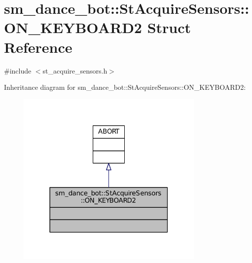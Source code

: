 \hypertarget{structsm__dance__bot_1_1StAcquireSensors_1_1ON__KEYBOARD2}{}\section{sm\+\_\+dance\+\_\+bot\+:\+:St\+Acquire\+Sensors\+:\+:O\+N\+\_\+\+K\+E\+Y\+B\+O\+A\+R\+D2 Struct Reference}
\label{structsm__dance__bot_1_1StAcquireSensors_1_1ON__KEYBOARD2}


{\ttfamily \#include $<$st\+\_\+acquire\+\_\+sensors.\+h$>$}



Inheritance diagram for sm\+\_\+dance\+\_\+bot\+:\+:St\+Acquire\+Sensors\+:\+:O\+N\+\_\+\+K\+E\+Y\+B\+O\+A\+R\+D2\+:
\nopagebreak
\begin{figure}[H]
\begin{center}
\leavevmode
\includegraphics[width=259pt]{structsm__dance__bot_1_1StAcquireSensors_1_1ON__KEYBOARD2__inherit__graph}
\end{center}
\end{figure}


